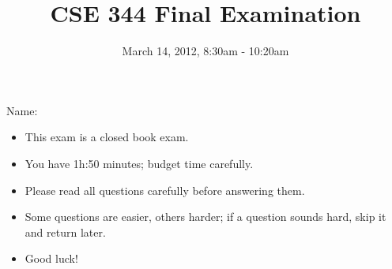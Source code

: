 \documentclass[addpoints,answers,12pt]{exam}
\begin{document}
\title{CSE 344 Final Examination} \author{} \date{March 14, 2012,
  8:30am - 10:20am}

\maketitle

\begin{center}
{
\vspace{1cm}

Name:\enspace\makebox[3in]{\hrulefill}

\vspace{1cm}

\gradetable
}
\end{center}

\begin{itemize}
\item This exam is a closed book exam.
\item You have 1h:50 minutes; budget time carefully.
\item Please read all questions carefully before answering them.
\item Some questions are easier, others harder; if a question sounds
  hard, skip it and return later.
\item Good luck!
\end{itemize}

\newpage
\end{document}
